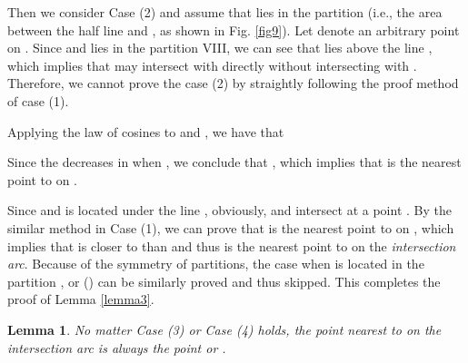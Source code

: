 \documentclass[journal]{IEEEtran}
\newtheorem{lemma}{Lemma}
\begin{document}
\begin{IEEEproof}
Then we consider Case (2) and assume that  lies in the partition  (i.e., the area between the half line  and , as shown in Fig. \ref{fig9}). Let  denote an arbitrary point on . Since  and  lies in the partition VIII, we can see that  lies above
the line , which implies that  may intersect with  directly without intersecting with . Therefore, we cannot
prove the case (2) by straightly following the proof method of case (1).

Applying the law of cosines to  and , we have that

Since the  decreases in  when , we conclude that , which implies that  is the nearest
point to  on .

Since  and  is located under the line ,
obviously,  and  intersect at a point . By the similar method in Case (1), we can prove that  is the
nearest point to  on , which implies that  is closer to  than  and thus is the nearest point to
 on the \emph{intersection arc}. Because of the symmetry of partitions, the case when  is located in the partition ,  or  () can be similarly proved and thus skipped. This completes the proof of Lemma \ref{lemma3}.
\end{IEEEproof}

\begin{lemma}\label{lemma4}
No matter Case (3) or Case (4) holds, the point nearest to  on the \emph{intersection arc} is always the point  or .
\end{lemma}
\end{document}
